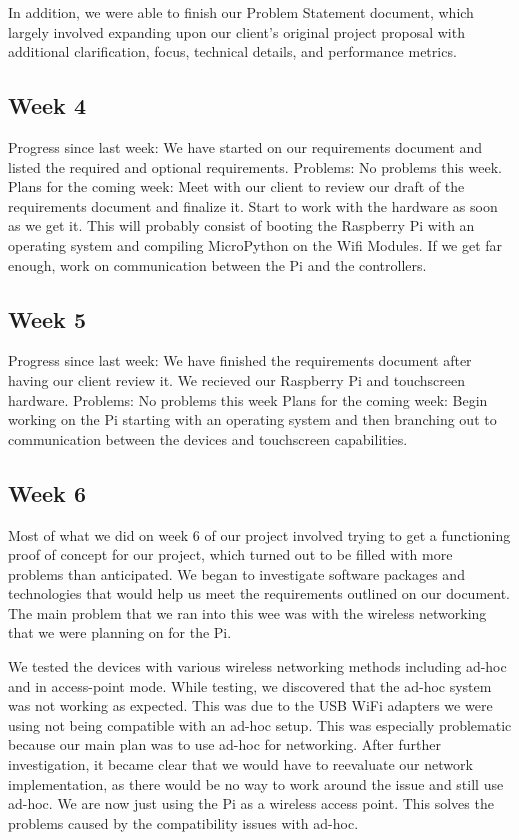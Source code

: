 \documentclass[letterpaper,10pt]{article}
\begin{document}
In addition, we were able to finish our Problem Statement document, which
largely involved expanding upon our client's original project proposal with
additional clarification, focus, technical details, and performance metrics.

\subsection{Week 4}
 
Progress since last week: 
We have started on our requirements document and listed the required and optional requirements. 
Problems: 
No problems this week. 
Plans for the coming week: 
Meet with our client to review our draft of the requirements document and finalize it. 
Start to work with the hardware as soon as we get it. This will probably consist of booting the Raspberry Pi with an operating system and compiling MicroPython on the Wifi Modules. 
If we get far enough, work on communication between the Pi and the controllers. 

\subsection{Week 5}
 
Progress since last week: 
We have finished the requirements document after having our client review it. 
We recieved our Raspberry Pi and touchscreen hardware. 
Problems: 
No problems this week 
Plans for the coming week: 
Begin working on the Pi starting with an operating system and then branching out to communication between the devices and touchscreen capabilities. 

\subsection{Week 6}
 
Most of what we did on week 6 of our project involved trying to get a functioning proof of concept for our project, which turned out to be filled with more problems than anticipated. We began to investigate software packages and technologies that would help us meet the requirements outlined on our document. The main problem that we ran into this wee was with the wireless networking that we were planning on for the Pi.

We tested the devices with various wireless networking methods including ad-hoc and in access-point mode. While testing, we discovered that the ad-hoc system was not working as expected. This was due to the USB WiFi adapters we were using not being compatible with an ad-hoc setup. This was especially problematic because our main plan was to use ad-hoc for networking. After further investigation, it became clear that we would have to reevaluate our network implementation, as there would be no way to work around the issue and still use ad-hoc. We are now just using the Pi as a wireless access point. This solves the problems caused by the compatibility issues with ad-hoc.
\end{document}
